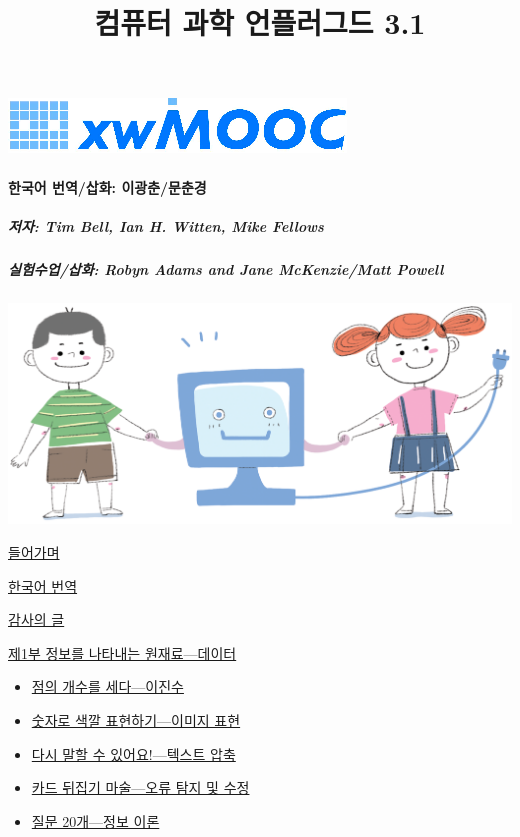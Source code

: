 \documentclass[]{article}
\title{컴퓨터 과학 언플러그드 3.1}
\author{}
\date{}
\begin{document}
\maketitle

{
\hypersetup{linkcolor=black}
\setcounter{tocdepth}{3}
\tableofcontents
}

\href{http://www.xwmooc.net}{\includegraphics{./img/xwMOOC-logo.png}}

\mbox{}\paragraph{한국어 번역/삽화: 이광춘/문춘경}

{}

\subparagraph{저자: Tim Bell, Ian H. Witten, Mike Fellows}

{}

\subparagraph{실험수업/삽화: Robyn Adams and Jane McKenzie/Matt Powell}

\includegraphics{img/00_cover_boy_girl.png}

\hyperref[intro]{들어가며}

\hyperref[korean-translation]{한국어 번역}

\hyperref[acknowledgement]{감사의 글}

\hyperref[part-i]{제1부 정보를 나타내는 원재료---데이터}

\begin{itemize}
\itemsep1pt\parskip0pt
\item
  \hyperref[binary-numbers]{점의 개수를 세다---이진수}
\item
  \hyperref[image-representation]{숫자로 색깔 표현하기---이미지 표현}
\item
  \hyperref[text-compression]{다시 말할 수 있어요!---텍스트 압축}
\item
  \hyperref[error-detection-and-correction]{카드 뒤집기 마술---오류 탐지
  및 수정}
\item
  \hyperref[information-theory]{질문 20개---정보 이론}
\end{itemize}
\end{document}
